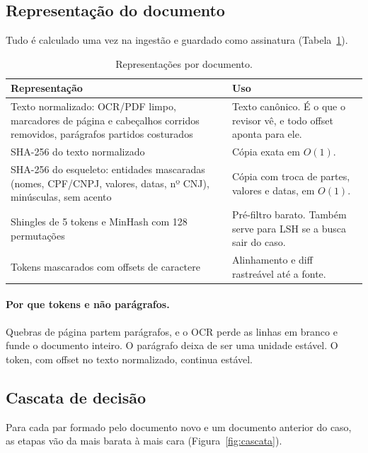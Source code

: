 \documentclass[11pt,a4paper]{article}
\begin{document}
\subsection{Representação do documento}

Tudo é calculado uma vez na ingestão e guardado como assinatura (Tabela~\ref{tab:repr}).

\begin{table}[H]
\centering
\small
\begin{tabular}{p{5.6cm}p{8.6cm}}
\toprule
Representação & Uso \\
\midrule
Texto normalizado: OCR/PDF limpo, marcadores de página e cabeçalhos corridos removidos,
parágrafos partidos costurados & Texto canônico. É o que o revisor vê, e todo offset aponta
para ele. \\
SHA-256 do texto normalizado & Cópia exata em $O(1)$. \\
SHA-256 do esqueleto: entidades mascaradas (nomes, CPF/CNPJ, valores, datas, nº CNJ),
minúsculas, sem acento & Cópia com troca de partes, valores e datas, em $O(1)$. \\
Shingles de 5 tokens e MinHash com 128 permutações & Pré-filtro barato. Também serve para LSH
se a busca sair do caso. \\
Tokens mascarados com offsets de caractere & Alinhamento e diff rastreável até a fonte. \\
\bottomrule
\end{tabular}
\caption{Representações por documento.}
\label{tab:repr}
\end{table}

\paragraph{Por que tokens e não parágrafos.} Quebras de página partem parágrafos, e o OCR perde
as linhas em branco e funde o documento inteiro. O parágrafo deixa de ser uma unidade estável. O
token, com offset no texto normalizado, continua estável.

\subsection{Cascata de decisão}

Para cada par formado pelo documento novo e um documento anterior do caso, as etapas vão da mais
barata à mais cara (Figura~\ref{fig:cascata}).
\end{document}
